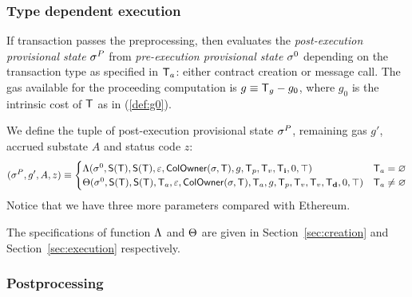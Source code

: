 \subsubsection{Type dependent execution}

If transaction passes the preprocessing, 
then {\name} evaluates the \emph{post-execution provisional state} $\mathbf{\sigma}^P$ from \emph{pre-execution provisional state} $\mathbf{\sigma}^0$ depending on the transaction type as specified in $\textsf{T}_a$: either contract creation or message call. 
%
The gas available for the proceeding computation is $g\equiv \textsf{T}_g-g_0$, where $g_0$ is the intrinsic cost of $\textsf{T}$ as in (\ref{def:g0}). 

We define the tuple of post-execution provisional state $\mathbf{\sigma}^{P}$, remaining gas $g'$, accrued substate $A$ and status code $z$:
\begin{align}\label{def:transform}
	(\mathbf{\sigma}^{P},g',A,z)\equiv
	\begin{cases}
		\mathrm{\Lambda}(\mathbf{\sigma}^0,\mathsf{S}{\left({\textsf{T}} \right)},\mathsf{S}{\left({\textsf{T}} \right)},\mathbb{\varepsilon}, \mathsf{ColOwner}(\mathbf{\sigma},\textsf{T}),g,\textsf{T}_p,\textsf{T}_v,\textsf{T}_{\bf i},0,\top) &  \textsf{T}_a=\varnothing \\
		\mathrm{\Theta}(\mathbf{\sigma}^0,\mathsf{S}{\left({\textsf{T}} \right)},\mathsf{S}{\left({\textsf{T}} \right)},\textsf{T}_a,\mathbb{\varepsilon},\mathsf{ColOwner}(\mathbf{\sigma},\textsf{T}),\textsf{T}_a,g,\textsf{T}_p,\textsf{T}_v,\textsf{T}_v,\textsf{T}_{\bf d},0,\top) & \textsf{T}_a\neq\varnothing
	\end{cases}
\end{align}
%
Notice that we have three more parameters compared with Ethereum. 

The specifications of function $\mathrm{\Lambda}$ and $\mathrm{\Theta}$ are given in Section~\ref{sec:creation} and Section~\ref{sec:execution} respectively.

\subsubsection{Postprocessing}



